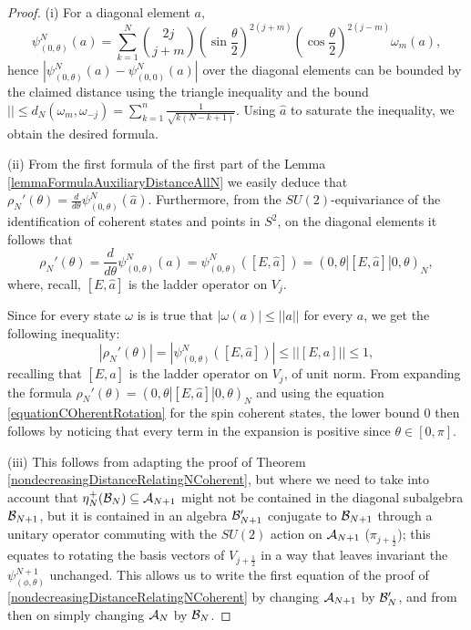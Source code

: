 \begin{proof}
(i) For a diagonal element $a$,  
\begin{equation*}
    \psi^N_{(0, \theta)}(a) = \sum_{k = 1}^N \binom{2j}{j+m} (\sin \frac{\theta}{2})^{2(j+m)} (\cos \frac{\theta}{2})^{2(j-m)} \omega_m(a),
\end{equation*}
hence $|\psi^N_{(0, \theta)}(a) - \psi^N_{(0, 0)}(a)|$ over the diagonal elements can be bounded by the claimed distance using the triangle inequality and the bound $|| \leq d_N(\omega_m, \omega_{-j}) = \sum_{k = 1}^n \frac{1}{\sqrt{k(N - k+1)}}$. Using $\hat a$ to saturate the inequality, we obtain the desired formula.

(ii) From the first formula of the first part of the Lemma \ref{lemmaFormulaAuxiliaryDistanceAllN} we easily deduce that $\rho_N'(\theta) = \frac{d}{d\theta} \psi^N_{(0, \theta)} (\hat a)$. Furthermore, from the $SU(2)$-equivariance of the identification of coherent states and points in $S^2$, on the diagonal elements it follows that 
\begin{equation}
    \rho_N'(\theta) 
        =\frac{d}{d\theta} \psi^N_{(0, \theta)} (\hat a) 
        = \psi^N_{(0, \theta)}([E, \hat a])
        = (0, \theta| [E, \hat a] |0, \theta)_N,
\end{equation} 
where, recall, $[E, \hat a]$ is the ladder operator on $V_j$.

Since for every state $\omega$ is is true that $|\omega(a)| \leq ||a||$ for every $a$, we get the following inequality:
\begin{equation*}
    |\rho_N'(\theta)| = |\psi^N_{(0, \theta)}([E, \hat a])| \leq ||[E, a]|| \leq 1,
\end{equation*}
recalling that $[E, \hat a]$ is the ladder operator on $V_j$, of unit norm. From expanding the formula $\rho_N'(\theta) = (0, \theta| [E, \hat a] |0, \theta)_N$ and using the equation \eqref{equationCOherentRotation} for the spin coherent states, the lower bound $0$ then follows by noticing that every term in the expansion is positive since $\theta \in [0, \pi]$.

(iii) This follows from adapting the proof of Theorem \ref{nondecreasingDistanceRelatingNCoherent}, but where we need to take into account that $\eta^+_N(\mathcal B_N) \subseteq \mathcal A_{N+1}$ might not be contained in the diagonal subalgebra $\mathcal B_{N+1}$, but it is contained in an algebra $\mathcal B_{N+1}'$ conjugate to $\mathcal B_{N+1}$ through a unitary operator commuting with the $SU(2)$ action on $\mathcal A_{N+1}$ ($\pi_{j + \frac{1}{2}}$); this equates to rotating the basis vectors of $V_{j + \frac{1}{2}}$ in a way that leaves invariant the $\psi^{N+1}_{(\phi, \theta)}$ unchanged. This allows us to write the first equation of the proof of \ref{nondecreasingDistanceRelatingNCoherent} by changing $\mathcal A_{N+1}$ by $\mathcal B'_N$, and from then on simply changing $\mathcal A_N$ by $\mathcal B_N$.
\end{proof}


